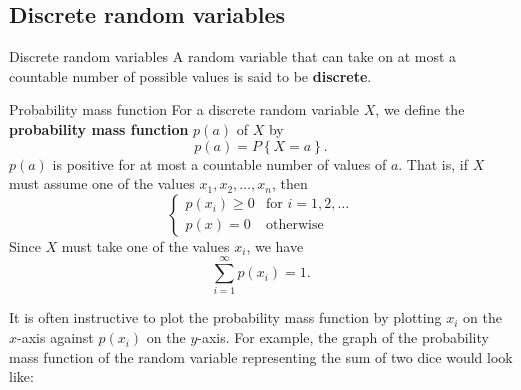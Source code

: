 \subsection{Discrete random variables}
\begin{bdef}{Discrete random variables}\label{discreterandomvariables}
    A random variable that can take on at most a countable number of possible values is said to be \textbf{discrete}.
\end{bdef}
\begin{bdef}{Probability mass function}\label{probabilitymassfunction}
    For a discrete random variable $X$, we define the \textbf{probability mass function} $p(a)$ of $X$ by \[
        p(a) = P\left\{ X = a \right\}.    
    \] $p(a)$ is positive for at most a countable number of values of $a$. That is, if $X$ must assume one of the values $x_1, x_2, \dots, x_n$, then \[
        \begin{cases}
            p(x_i) \geq 0 & \text{for } i = 1, 2, \dots \\
            p(x) = 0 & \text{otherwise} 
        \end{cases}    
    \] Since $X$ must take one of the values $x_i$, we have \[
        \sum^\infty_{i = 1} p(x_i) = 1.    
    \]
\end{bdef}
It is often instructive to plot the probability mass function by plotting $x_i$ on the $x$-axis against $p(x_i)$ on the $y$-axis. For example, the graph of the probability mass function of the random variable representing the sum of two dice would look like:
\begin{center}    
\end{center}
